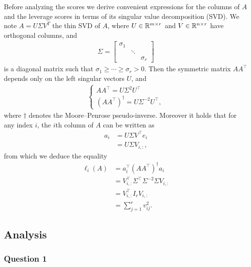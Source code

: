 \documentclass{article}
\begin{document}
Before analyzing the scores we derive convenient expressions for the columns of
$A$ and the leverage scores in terms of its singular value decomposition (SVD).
We note $A = U \Sigma V^T$ the thin SVD of $A$,
where $U \in {\mathbb R}^{m \times r}$ and $V \in {\mathbb R}^{n \times r}$ have
orthogonal columns, and
\begin{align*}
  \Sigma =
  \begin{bmatrix}
    \sigma_1 & & \\
    & \ddots & \\
    & & \sigma_r
  \end{bmatrix}
\end{align*}
is a diagonal matrix such that $\sigma_1 \geq \cdots \geq \sigma_r > 0$.
Then the symmetric matrix $A A^\top$ depends only on the left singular vectors
$U$, and
\begin{align*}
  \begin{cases}
    AA^\top = U \Sigma^2 U^\top\\
    (AA^\top)^\dagger = U \Sigma^{-2} U^\top,
  \end{cases}
\end{align*}
where $\dagger$ denotes the Moore–Penrose pseudo-inverse.
Moreover it holds that for any index $i$, the $i$th column of $A$ can be written
as
\begin{align}\label{eq:acol}
  a_i &= U \Sigma V^\top e_i\nonumber\\
      &= U \Sigma V_{i,:},
\end{align}
from which we deduce the equality
\begin{align}\label{eq:ellid}
  \ell_i(A) &= a_i^\top (A A^\top)^\dagger a_i\nonumber\\
            &= V_{i,:}^\top \Sigma^\top \Sigma^{-2} \Sigma V_{i,:}\nonumber\\
            &= V_{i,:}^\top I_r V_{i,:}\nonumber\\
            &= \sum_{j = 1}^r v_{ij}^2.
\end{align}

\subsection{Analysis}\label{subsec:analysis}

\subsubsection{Question 1}\label{subsubsec:q1}
\end{document}
